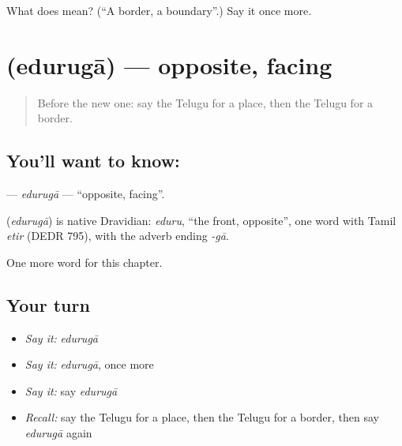 \begin{tcolorbox}[breakable,colback=teal!4,colframe=teal!35!black,title={Before you move on}]
What does  mean? (\textquotedblleft{}A border, a boundary\textquotedblright{}.) Say it once more.
\end{tcolorbox}
\section[\texorpdfstring{\te{ఎదురుగా} (edurugā)}{ఎదురుగా (edurugā)}]{ (edurugā) — opposite, facing}

\label{lesson:TE-C291-eduruga}



\begin{quote}
Before the new one: say the Telugu for a place, then the Telugu for a border.
\end{quote}

\subsection*{You'll want to know: }
\textbf{} — \emph{edurugā} — \textquotedblleft{}opposite, facing\textquotedblright{}.

\begin{cousinweb}
\textbf{} (\emph{edurugā}) is native Dravidian: \emph{eduru}, \textquotedblleft{}the front, opposite\textquotedblright{}, one word with Tamil \emph{etir} (DEDR 795), with the adverb ending \emph{-gā}.
\end{cousinweb}

\begin{grammarlens}[title={What you've built}]
One more word for this chapter.
\end{grammarlens}

\subsection*{Your turn}
\begin{itemize}
\raggedright
  \item \emph{Say it:} \emph{edurugā}
  \item \emph{Say it:} \emph{edurugā}, once more
  \item \emph{Say it:} say \emph{edurugā}
  \item \emph{Recall:} say the Telugu for a place, then the Telugu for a border, then say \emph{edurugā} again
\end{itemize}

